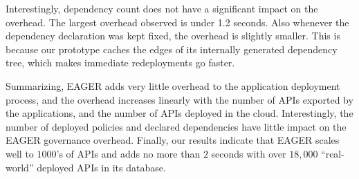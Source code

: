 Interestingly, dependency count does not have a significant impact on 
the overhead. %
The largest overhead observed is under 1.2 seconds.
Also whenever the dependency declaration was kept fixed, the overhead is slightly smaller. This is because our prototype caches
the edges of its internally generated dependency tree, 
which makes immediate redeployments go faster.

Summarizing, 
EAGER adds very little overhead to the application deployment process, and the
overhead increases linearly with the number of APIs exported by the applications, and the number of APIs deployed in the cloud. 
Interestingly, the number of deployed policies and declared dependencies
have little impact on the EAGER governance overhead. Finally, our results indicate that EAGER scales
well to $1000$'s of APIs and adds no more than $2$ seconds with over
$18,000$ ``real-world''
deployed APIs in its database.
